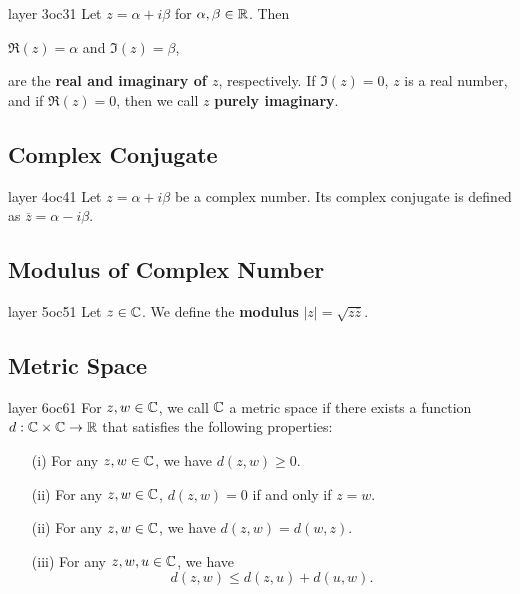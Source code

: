 \documentclass[a4paper]{article}
\begin{document}
\begin{ocg}{layer 3}{oc3}{1}
   Let \( z = \alpha + i \beta  \) for \( \alpha, \beta \in \mathbb{R}  \). Then  
   \begin{center}
       \( \Re(z) = \alpha  \) and \( \Im(z) = \beta   \),
   \end{center}
   are the \textbf{real and imaginary of \( z  \)}, respectively.
   If \( \Im(z) = 0   \), \( z  \) is a real number, and if \( \Re(z) = 0  \), then we call \( z  \) \textbf{purely imaginary}.
\end{ocg}


\subsection*{Complex Conjugate}
\begin{ocg}{layer 4}{oc4}{1}
    Let \( z = \alpha + i \beta  \) be a complex number. Its complex conjugate is defined as \( \overline{z} = \alpha - i \beta  \).
\end{ocg}


\subsection*{Modulus of Complex Number}


\begin{ocg}{layer 5}{oc5}{1}
   Let \( z \in \mathbb{C}  \). We define the \textbf{modulus} \( | z  |  = \sqrt{ z \overline{z} }  \).
\end{ocg}



\subsection*{Metric Space}

\begin{ocg}{layer 6}{oc6}{1}
   For \( z,w \in \mathbb{C}  \), we call \( \mathbb{C}  \) a metric space if there exists a function \( d: \mathbb{C} \times \mathbb{C} \to \mathbb{R}   \) that satisfies the following properties: 
   \begin{enumerate}
       \item[(i)] For any \( z,w \in \mathbb{C}  \), we have \( d(z,w) \geq 0 \).
       \item[(ii)] For any \( z,w \in \mathbb{C}  \), \( d(z,w) = 0 \) if and only if \( z = w  \).
        \item[(ii)] For any \( z,w \in \mathbb{C}  \), we have \( d(z,w) = d(w,z) \).
        \item[(iii)] For any \( z,w,u \in \mathbb{C}  \), we have 
            \[  d(z,w) \leq d(z,u) + d(u,w). \]
   \end{enumerate}
\end{ocg}

\end{document}

